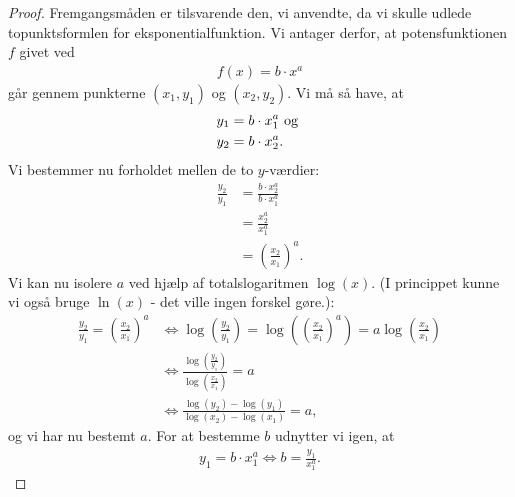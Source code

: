 \documentclass[12pt]{article}
\begin{document}
\begin{proof}
Fremgangsmåden er tilsvarende den, vi anvendte, da vi skulle udlede topunktsformlen for eksponentialfunktion. Vi antager derfor, at potensfunktionen $f$ givet ved
\begin{align*}
f(x) = b\cdot x^a
\end{align*}
går gennem punkterne $(x_1,y_1)$ og $(x_2,y_2)$. Vi må så have, at 
\begin{align*}
y_1 &= b\cdot x_1^a \textnormal{ og }\\ y_2 &= b\cdot x_2^a.
\end{align*}
Vi bestemmer nu forholdet mellen de to $y$-værdier:
\begin{align*}
\frac{y_2}{y_1} &= \frac{b\cdot x_2^a}{b\cdot x_1^a}\\
&= \frac{x_2^a}{x_1^a}\\
&= \left(\frac{x_2}{x_1}\right)^a.
\end{align*}
Vi kan nu isolere $a$ ved hjælp af totalslogaritmen $\log(x)$. (I princippet kunne vi også bruge $\ln(x)$ - det ville ingen forskel gøre.):
\begin{align*}
\frac{y_2}{y_1} = \left(\frac{x_2}{x_1}\right)^a &\Leftrightarrow \log\left(\frac{y_2}{y_1}\right) = \log\left(\left(\frac{x_2}{x_1}\right)^a\right) = a\log\left(\frac{x_2}{x_1}\right)\\
&\Leftrightarrow \frac{\log\left(\frac{y_2}{y_1}\right)}{\log\left(\frac{x_2}{x_1}\right)} = a\\
&\Leftrightarrow \frac{\log(y_2)-\log(y_1)}{\log(x_2)-\log(x_1)} = a,
\end{align*}
og vi har nu bestemt $a$. 
For at bestemme $b$ udnytter vi igen, at 
\begin{align*}
y_1 = b\cdot x_1^a \Leftrightarrow b = \frac{y_1}{x_1^a}.
\end{align*} 
\end{proof}
\end{document}
